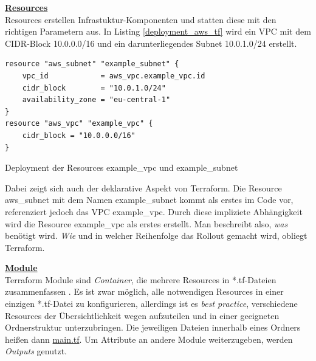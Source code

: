 \textbf{\underline{Resources}}\\
Resources erstellen Infrastuktur-Komponenten und statten diese mit den richtigen Parametern aus. In Listing \ref{deployment_aws_tf} wird ein VPC mit dem CIDR-Block 10.0.0.0/16 und ein darunterliegendes Subnet 10.0.1.0/24 erstellt.
\begin{listing}[h]
\begin{verbatim}
resource "aws_subnet" "example_subnet" {
    vpc_id            = aws_vpc.example_vpc.id
    cidr_block        = "10.0.1.0/24"
    availability_zone = "eu-central-1"
}
resource "aws_vpc" "example_vpc" {
    cidr_block = "10.0.0.0/16"
}
\end{verbatim}
\caption{Deployment der Resources \glqq example\_vpc\grqq{} und \glqq example\_subnet\grqq{}}
\label{deployment_aws_tf}
\end{listing}
Dabei zeigt sich auch der deklarative Aspekt von Terraform. Die Resource \glqq aws\_subnet\grqq{} mit dem Namen \glqq example\_subnet\grqq{} kommt als erstes im Code vor, referenziert jedoch das VPC \glqq example\_vpc\grqq{}. Durch diese impliziete Abhängigkeit wird die Resource \glqq example\_vpc\grqq{} als erstes erstellt. Man beschreibt also, \textit{was} benötigt wird. \textit{Wie} und in welcher Reihenfolge das Rollout gemacht wird, obliegt Terraform.

\textbf{\underline{Module}}\\
Terraform Module sind \textit{Container}, die mehrere Resources in *.tf-Dateien zusammenfassen \cite{tfmodule2021}. Es ist zwar möglich, alle notwendigen Resources in einer einzigen *.tf-Datei zu konfigurieren, allerdings ist es \textit{best practice}, verschiedene Resources der Übersichtlichkeit wegen aufzuteilen und in einer geeigneten Ordnerstruktur unterzubringen. Die jeweiligen Dateien innerhalb eines Ordners heißen dann \underline{main.tf}. Um Attribute an andere Module weiterzugeben, werden \textit{Outputs} genutzt. 

